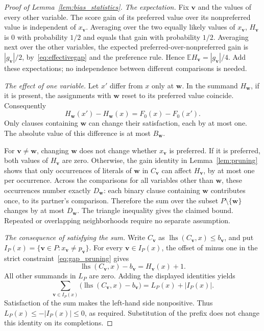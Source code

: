 \documentclass[11pt,a4paper]{article}
\theoremstyle{definition}
\theoremstyle{remark}
\newcommand{\E}{\mathbb E}
\begin{document}
\begin{proof}[Proof of Lemma~\ref{lem:bias_statistics}]
\emph{The expectation.}
Fix $\mathbf v$ and the values of every other variable. The score gain of
its preferred value over its nonpreferred value is independent of
$x_{\mathbf v}$. Averaging over the two equally likely values of
$x_{\mathbf v}$, $H_{\mathbf v}$ is $0$ with
probability $1/2$ and equals that gain with probability $1/2$. Averaging next over the
other variables, the expected preferred-over-nonpreferred gain is
$|g_{\mathbf v}|/2$, by~\eqref{eq:effectivegap} and the preference rule.
Hence $\E H_{\mathbf v}=|g_{\mathbf v}|/4$. Add these expectations;
no independence between different comparisons is needed.

\emph{The effect of one variable.}
Let $x'$ differ from $x$ only at $\mathbf w$. In the summand
$H_{\mathbf w}$, if it is present, the assignments with $\mathbf w$
reset to its preferred value coincide. Consequently
\[
 H_{\mathbf w}(x')-H_{\mathbf w}(x)=F_0(x)-F_0(x').
\]
Only clauses containing $\mathbf w$ can change their satisfaction, each
by at most one. The absolute value of this difference is at most
$B_{\mathbf w}$.

For $\mathbf v\ne\mathbf w$, changing $\mathbf w$ does not change whether
$x_{\mathbf v}$ is preferred. If it is preferred, both values of
$H_{\mathbf v}$ are zero. Otherwise, the gain identity in
Lemma~\ref{lem:pruning} shows that only occurrences of literals of
$\mathbf w$ in $C_{\mathbf v}$ can affect $H_{\mathbf v}$, by at most
one per occurrence. Across the comparisons for all variables other than
$\mathbf w$, these occurrences number exactly $D_{\mathbf w}$: each
binary clause containing $\mathbf w$ contributes once, to its partner's
comparison. Therefore the sum over the subset $P\setminus\{\mathbf w\}$
changes by at most $D_{\mathbf w}$. The triangle inequality gives the
claimed bound. Repeated or overlapping neighborhoods require no separate
assumption.

\emph{The consequence of satisfying the sum.}
Write $C_{\mathbf v}$ as
$\operatorname{lhs}(C_{\mathbf v},x)\le b_{\mathbf v}$, and put
$I_P(x)=\{\mathbf v\in P:x_{\mathbf v}\ne p_{\mathbf v}\}$.
For every $\mathbf v\in I_P(x)$, the offset of minus one in the strict constraint~\eqref{eq:gap_pruning} gives
\[
 \operatorname{lhs}(C_{\mathbf v},x)-b_{\mathbf v}
       =H_{\mathbf v}(x)+1.
\]
All other summands in $L_P$ are zero. Adding the displayed identities yields
\begin{equation}
 \sum_{\mathbf v\in I_P(x)}
       \bigl(\operatorname{lhs}(C_{\mathbf v},x)-b_{\mathbf v}\bigr)
       =L_P(x)+|I_P(x)|.
 \label{eq:bias_surplus}
\end{equation}
Satisfaction of the sum makes the left-hand side nonpositive. Thus
$L_P(x)\le-|I_P(x)|\le0$, as required. Substitution of the prefix does
not change this identity on its completions.
\end{proof}
\end{document}
